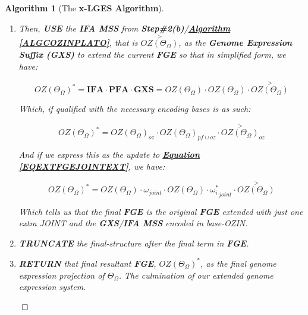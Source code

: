 \documentclass[a4paper, 18pt]{book} %
\newtheorem{alg}{Algorithm}
\begin{document}
\begin{alg}[The \textbf{x-LGES Algorithm}]
\begin{enumerate}
{}
\item {

Then, \textbf{USE} the \textbf{IFA MSS} from \textbf{Step\#2(b)}/\textbf{\hyperref[ALGCOZINPLATO]{Algorithm \ref{ALGCOZINPLATO}}}, that is $\overset{>}{OZ(\Theta_\Omega)}$, as the \textbf{Genome Expression Suffix (GXS)} to extend the current \textbf{FGE} so that in simplified form, we have:

\vspace{1em}
\begin{equation}
\label{EQTRANSLGENSEQEXT}
\boxed{OZ(\Theta_\Omega)}^* = \textbf{IFA} \cdot \textbf{PFA} \cdot \textbf{GXS} = OZ(\Theta_\Omega)\cdot\boxed{OZ(\Theta_\Omega)}\cdot\overset{>}{OZ(\Theta_\Omega)}
\end{equation}
\vspace{1em}

Which, if qualified with the necessary encoding bases is as such:

\vspace{1em}
\begin{equation}
\label{EQTRANSLGENSEQEXTQUAL}
\boxed{OZ(\Theta_\Omega)}^* = OZ(\Theta_\Omega)_{oz}\cdot\boxed{OZ(\Theta_\Omega)}_{pf\cup oz}\cdot\overset{>}{OZ(\Theta_\Omega)}_{oz}
\end{equation}
\vspace{1em}

And if we express this as the update to \textbf{\hyperref[EQEXTFGEJOINTEXT]{Equation \ref{EQEXTFGEJOINTEXT}}}, we have:

\vspace{1em}
\begin{equation}
		\label{EQEXTFGEJOINTEXT_B}
		\boxed{OZ(\Theta_\Omega)}^* =  OZ(\Theta_\Omega) \cdot \boxed{\omega}_{joint} \cdot \boxed{OZ(\Theta_\Omega)} \cdot \boxed{\omega_i^*}_{joint} \cdot\overset{>}{OZ(\Theta_\Omega)}
		\end{equation}	
		\vspace{1em}
		
		Which tells us that the final \textbf{FGE} is the original \textbf{FGE} extended with just one extra JOINT and the \textbf{GXS}/\textbf{IFA MSS} encoded in base-OZIN.

}
\item \textbf{TRUNCATE} the final-structure after the final term in \textbf{FGE}.
\item \textbf{RETURN} that final resultant \textbf{FGE}, $\boxed{OZ(\Theta_\Omega)}^*$, as the final genome expression projection of $\Theta_\Omega$. The culmination of our extended genome expression system.
\end{enumerate}
$\qed$
\end{alg}
\vspace{2em}
\end{document}
